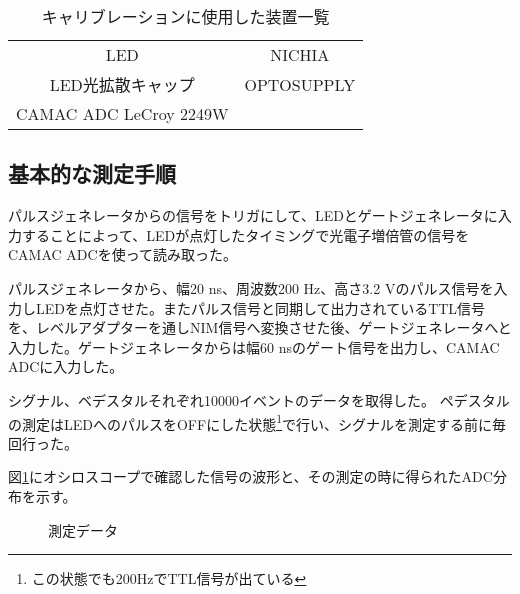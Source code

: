 \documentclass[11pt]{jreport}
\newcommand{\figref}[1]{図\ref{#1}}
\begin{document}

\begin{table}[htdp]
\caption{キャリブレーションに使用した装置一覧}
\begin{center}
\begin{tabular}{cc}
\hline \hline
LED & NICHIA \\
LED光拡散キャップ & OPTOSUPPLY\\
CAMAC ADC LeCroy 2249W\\
\hline \hline
\end{tabular}
\end{center}
\label{default}
\end{table}%
\fi


\subsection{基本的な測定手順}

パルスジェネレータからの信号をトリガにして、LEDとゲートジェネレータに入力することによって、LEDが点灯したタイミングで光電子増倍管の信号をCAMAC ADCを使って読み取った。

パルスジェネレータから、幅20 ns、周波数200 Hz、高さ3.2 Vのパルス信号を入力しLEDを点灯させた。またパルス信号と同期して出力されているTTL信号を、レベルアダプターを通しNIM信号へ変換させた後、ゲートジェネレータへと入力した。ゲートジェネレータからは幅60 nsのゲート信号を出力し、CAMAC ADCに入力した。

シグナル、ベデスタルそれぞれ10000イベントのデータを取得した。
ペデスタルの測定はLEDへのパルスをOFFにした状態\footnote{この状態でも200HzでTTL信号が出ている}で行い、シグナルを測定する前に毎回行った。

\figref{CalibMeasurement}にオシロスコープで確認した信号の波形と、その測定の時に得られたADC分布を示す。

\begin{figure}[htbp]
  \begin{minipage}{0.47\textwidth}
  \end{minipage}
\hfill%
  \begin{minipage}{0.47\textwidth}
  \end{minipage}
    \caption[測定データ]{測定データ}
  \label{CalibMeasurement}
\end{figure}
\end{document}
